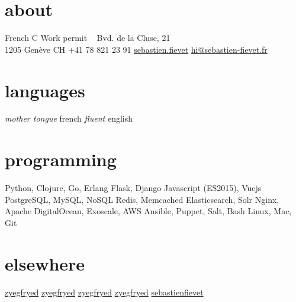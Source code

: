 \documentclass[]{friggeri}
\begin{document}

\begin{acronym}
\end{acronym}

\begin{aside}
  \section{about}
    French
    C Work permit
    ~
    {\FA \faHome} Bvd. de la Cluse, 21\\1205 Genève CH
    {\FA \faPhone} +41 78 821 23 91
    \href{skype:sebastienfievet?call}{{\FAB \faSkype} sebastien.fievet}
    {\FA \faEnvelope} \href{mailto:hi@sebastien-fievet.fr}{hi@sebastien-fievet.fr}
  \section{languages}
    \emph{mother tongue} french
    \emph{fluent} english
  \section{programming}
    {\color{red} {\FA \faHeart}} Python, Clojure, Go, Erlang
    Flask, Django
    Javascript (ES2015), Vuejs
    PostgreSQL, MySQL, NoSQL
    Redis, Memcached
    Elasticsearch, Solr
    Nginx, Apache
    DigitalOcean, Exoscale, AWS
    Ansible, Puppet, Salt, Bash
    Linux, Mac, Git
  \section{elsewhere}
    \href{https://twitter.com/zyegfryed}{{\FAB \faTwitter} zyegfryed}
    \href{https://github.com/zyegfryed}{{\FAB \faGithub} zyegfryed}
    \href{https://bitbucket.org/zyegfryed}{{\FAB \faBitbucket} zyegfryed}
    \href{https://speakerdeck.com/zyegfryed}{{\FA \faBullhorn} zyegfryed}
    \href{http://www.linkedin.com/in/sebastienfievet}{{\FAB \faLinkedin} sebastienfievet}
\end{aside}
\end{document}
